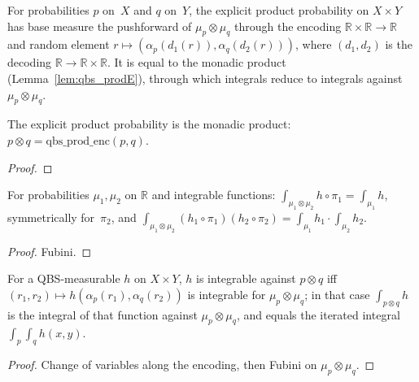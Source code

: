 \begin{definition}\label{def:qbs_prod_enc}
  \rocqok
  For probabilities $p$ on~$X$ and $q$ on~$Y$, the explicit product
  probability on $X \times Y$ has base measure the pushforward of
  $\mu_p \otimes \mu_q$ through the encoding
  $\mathbb{R}\times\mathbb{R} \to \mathbb{R}$ and random element
  $r \mapsto (\alpha_p(d_1(r)), \alpha_q(d_2(r)))$, where
  $(d_1, d_2)$ is the decoding $\mathbb{R} \to \mathbb{R}\times\mathbb{R}$.
  It is equal to the monadic product (Lemma~\ref{lem:qbs_prodE}),
  through which integrals reduce to integrals against
  $\mu_p \otimes \mu_q$.
\end{definition}

\begin{lemma}\label{lem:qbs_prodE}
  \rocqok
  The explicit product probability is the monadic product:
  $p \otimes q = \mathrm{qbs\_prod\_enc}(p, q)$.
\end{lemma}
\begin{proof}\rocqok\end{proof}

\begin{lemma}\label{lem:expectation_prod}
  \rocqok
  For probabilities $\mu_1, \mu_2$ on $\mathbb{R}$ and integrable
  functions: $\int_{\mu_1 \otimes \mu_2} h \circ \pi_1 = \int_{\mu_1} h$,
  symmetrically for~$\pi_2$, and
  $\int_{\mu_1 \otimes \mu_2} (h_1 \circ \pi_1)(h_2 \circ \pi_2)
  = \int_{\mu_1} h_1 \cdot \int_{\mu_2} h_2$.
\end{lemma}
\begin{proof}\rocqok Fubini.\end{proof}

\begin{theorem}\label{thm:qbs_pair_integral_iterated}
  \rocqok
  For a QBS-measurable $h$ on $X \times Y$, $h$ is integrable against
  $p \otimes q$ iff $(r_1, r_2) \mapsto h(\alpha_p(r_1), \alpha_q(r_2))$ is
  integrable for $\mu_p \otimes \mu_q$; in that case
  $\int_{p \otimes q} h$ is the integral of that function against
  $\mu_p \otimes \mu_q$, and equals the iterated integral
  $\int_p \int_q h(x, y)$.
\end{theorem}
\begin{proof}
  \rocqok
  Change of variables along the encoding, then Fubini on
  $\mu_p \otimes \mu_q$.
\end{proof}

